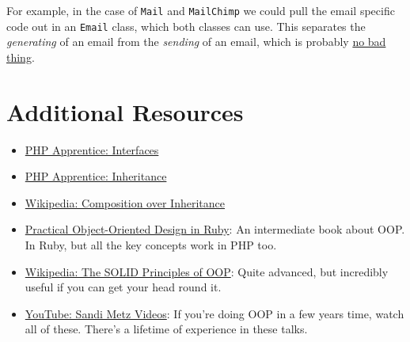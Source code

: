 For example, in the case of \texttt{Mail} and \texttt{MailChimp} we could pull the email specific code out in an \texttt{Email} class, which both classes can use. This separates the \textit{generating} of an email from the \textit{sending} of an email, which is probably \href{https://en.wikipedia.org/wiki/Single-responsibility_principle}{no bad thing}.



\section{Additional Resources}

\begin{itemize}[leftmargin=*]
    \item \href{https://phpapprentice.com/interfaces.html}{PHP Apprentice: Interfaces}
    \item \href{https://phpapprentice.com/classes-inheritance.html}{PHP Apprentice: Inheritance}
    \item \href{https://en.wikipedia.org/wiki/Composition\_over\_inheritance}{Wikipedia: Composition over Inheritance}
    \item \href{https://www.poodr.com}{Practical Object-Oriented Design in Ruby}: An intermediate book about OOP. In Ruby, but all the key concepts work in PHP too.
    \item \href{https://en.wikipedia.org/wiki/SOLID}{Wikipedia: The SOLID Principles of OOP}: Quite advanced, but incredibly useful if you can get your head round it.
    \item \href{https://www.youtube.com/channel/UCk3yOoaVtORwXipuLZ3jWNg}{YouTube: Sandi Metz Videos}: If you're doing OOP in a few years time, watch all of these. There's a lifetime of experience in these talks.
\end{itemize}
